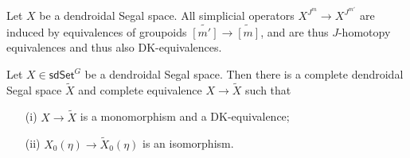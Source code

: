 \documentclass[a4paper,10pt
,draft
]{article}%
\begin{document}
\begin{remark}\label{ALLXJK REM}
	Let $X$ be a dendroidal Segal space. All simplicial operators
	$X^{J^m} \to X^{J^{m'}}$ are induced by equivalences of groupoids $\widetilde{[m']} \to \widetilde{[m]}$,
	and are thus $J$-homotopy equivalences and thus also DK-equivalences.
\end{remark}


\begin{proposition}\label{COMPLE PROP}
Let $X \in \mathsf{sdSet}^G$ be a dendroidal Segal space. 
Then there is a complete dendroidal Segal space $\tilde{X}$
and complete equivalence $X \to \tilde{X}$ such that
\begin{itemize}
	\item[(i)] $X \to \tilde{X}$ is a monomorphism and a DK-equivalence;
	\item[(ii)] $X_0(\eta) \to \tilde{X}_0(\eta)$ is an isomorphism.
\end{itemize}
\end{proposition}
\end{document}

